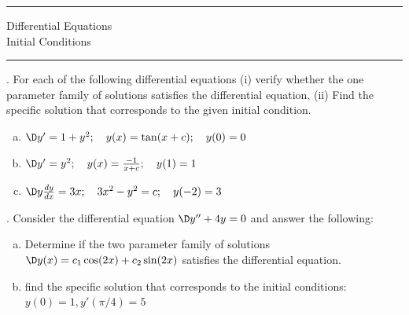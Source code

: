 \documentclass[12pt]{amsart}
\newcommand{\BACKROOT}{../../../..}
\newcommand{\TEACHINGROOT}{\BACKROOT}
\newcommand{\PATHTOHEADERS}{\TEACHINGROOT/Headers}
\numberwithin{equation}{section}
\begin{document}


\pagestyle{empty}

\noindent\rule{7.6in}{0.4pt}

{\centering\sc 
\noindent Differential Equations\\
 Initial Conditions \\
}
\noindent\rule{7.6in}{0.4pt}

\vspace{0.1cm}

. For each of the following differential equations (i) verify whether the one parameter family of solutions satisfies the differential equation, (ii) Find the specific solution that corresponds to the given initial condition. 
\begin{enumerate}[(a)]
\item  $\D y' = 1 + y^2; \quad y(x)=\tan(x+c); \quad y(0)=0$ \\

\newpage
\thispagestyle{empty}

\item  $\D y' = y^2; \quad y(x)=\frac{-1}{x+c}; \quad y(1)=1$ \\

\newpage
\thispagestyle{empty}

\item  $\D y\frac{dy}{dx} = 3x; \quad 3x^2-y^2=c; \quad y(-2)=3$ \\

\end{enumerate}

\newpage
\thispagestyle{empty}

. Consider the differential equation $\D y''+4y = 0$ and answer the following: 

\begin{enumerate}[(a)]
\item  Determine if the two parameter family of solutions $\D y(x)=c_1\cos(2x)+c_2\sin(2x)$ satisfies the differential equation. \\

\vfill

\item  find the specific solution that corresponds to the initial conditions: $y(0)=1, y'(\pi/4)=5$ \\

\vfill

\end{enumerate}
\end{document}
